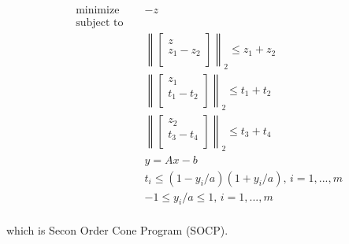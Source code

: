\documentclass{article}
\begin{document}
\begin{align*}
&\text{minimize } && - z \\
&\text{subject to } && \\
& && 
\left\lVert
\begin{bmatrix}
z \\ z_1 - z_2\\
\end{bmatrix}
\right\rVert_2 \leq z_1 + z_2\\
& && \left\lVert
\begin{bmatrix}
z_1 \\ t_1 - t_2\\
\end{bmatrix}
\right\rVert_2 \leq t_1 + t_2\\
& && \left\lVert
\begin{bmatrix}
z_2 \\ t_3 - t_4\\
\end{bmatrix}
\right\rVert_2 \leq t_3 + t_4\\
& && y = A x - b \\
& && t_i \leq (1 - y_i / a)(1 + y_i / a),
\, i = 1, ..., m\\
& && -1 \leq y_i / a \leq 1, \, i = 1, ..., m\\
\end{align*}

which is Secon Order Cone Program (SOCP).
\end{document}
